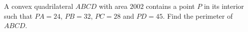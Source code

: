 A convex quadrilateral $ABCD$ with area $2002$ contains a point $P$ in its interior such that $PA=24$, $PB=32$, $PC=28$ and $PD=45$. Find the perimeter of $ABCD$.
